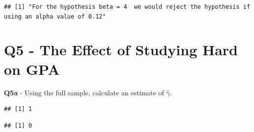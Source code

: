 \documentclass[
]{article}
\newenvironment{Shaded}{\begin{snugshade}}{\end{snugshade}}
\newcommand{\CommentTok}[1]{\textcolor[rgb]{0.56,0.35,0.01}{\textit{#1}}}
\newcommand{\FunctionTok}[1]{\textcolor[rgb]{0.13,0.29,0.53}{\textbf{#1}}}
\newcommand{\NormalTok}[1]{#1}
\newcommand{\SpecialCharTok}[1]{\textcolor[rgb]{0.81,0.36,0.00}{\textbf{#1}}}
\begin{document}
\begin{verbatim}
## [1] "For the hypothesis beta = 4  we would reject the hypothesis if using an alpha value of 0.12"
\end{verbatim}

\hfill\break
\hfill\break

\hypertarget{q5---the-effect-of-studying-hard-on-gpa}{%
\section{Q5 - The Effect of Studying Hard on
GPA}\label{q5---the-effect-of-studying-hard-on-gpa}}

\hfill\break

\textbf{Q5a} - Using the full sample, calculate an estimate of
\(\hat{\gamma}\).\\

\begin{Shaded}
\end{Shaded}

\begin{verbatim}
## [1] 1
\end{verbatim}

\begin{Shaded}
\end{Shaded}

\begin{verbatim}
## [1] 0
\end{verbatim}
\end{document}
